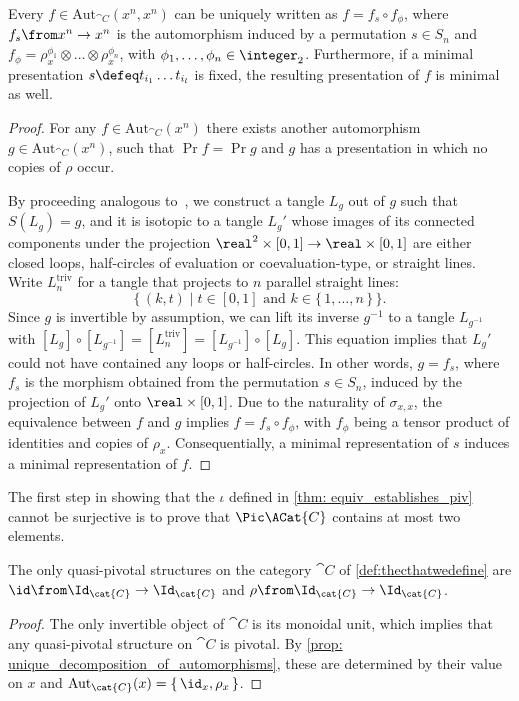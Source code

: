 \begin{proposition}\label{prop: unique_decomposition_of_automorphisms}
  Every \(f \in \mathrm{Aut}_{\cat{C}}(x^n, x^n)\) can be uniquely written as \(f = f_s \circ f_\phi\),
  where \(f_s \from x^n \to x^n\) is the automorphism induced by a permutation \(s \in S_n\) and
  \(f_\phi = \rho_x^{\phi_1} \otimes \dots \otimes \rho_x^{\phi_n}\),
  with \(\phi_1, \dots, \phi_n \in \integer_2\).
  Furthermore, if a minimal presentation \(s \defeq t_{i_1}\dots t_{i_l}\) is fixed, the resulting presentation of \(f\) is minimal as well.
\end{proposition}
\begin{proof}
  For any \(f \in \mathrm{Aut}_{\cat{C}}(x^n)\)
  there exists another automorphism \(g \in \mathrm{Aut}_{\cat{C}}(x^n)\),
  such that \(\Pr f = \Pr g\) and \(g\) has a presentation in which no copies of \(\rho\) occur.

  By proceeding analogous to~\cite[Lemma~\textsc{x}.3.3]{Kassel1998},
  we construct a tangle \(L_g\) out of \(g\) such that \(S(L_g)=g\),
  and it is isotopic to a tangle \(L_g'\) whose images of its connected components under the projection \(\real^2\times [0,1] \to \real\times [0,1]\) are either closed loops, half-circles of evaluation or coevaluation-type, or straight lines.
  Write \(L_n^{\text{triv}}\) for a tangle that projects to \(n\) parallel straight lines:
  \[
    \{\, (k,t) \mid t \in [0,1] \text{ and } k \in \{\,1, \dots, n\,\} \,\}.
  \]
  Since \(g\) is invertible by assumption,
  we can lift its inverse \(g^{-1}\) to a tangle \(L_{g^{-1}}\)
  with \([L_g] \circ [L_{g^{-1}}] = [L_n^{\text{triv}}] = [L_{g^{-1}}] \circ [L_g] \).
  This equation implies that \(L_g'\) could not have contained any loops or half-circles.
  In other words, \(g = f_s\), where \(f_s\) is the morphism obtained from the permutation \(s \in S_n\),
  induced by the projection of \(L_g'\) onto \(\real \times [0,1]\).
  Due to the naturality of \(\sigma_{x,x}\),
  the equivalence between \(f\) and \(g\) implies \(f = f_s \circ f_\phi\),
  with \(f_\phi\) being a tensor product of identities and copies of \(\rho_x\).
  Consequentially, a minimal representation of \(s\) induces a minimal representation of \(f\).
\end{proof}

The first step in showing that the \(\iota\) defined in \cref{thm: equiv_establishes_piv} cannot be surjective
is to prove that \(\Pic \ACat{C}\) contains at most two elements.

\begin{corollary}\label{cor: piv_on_C}
  The only quasi-pivotal structures on the category \(\cat{C}\) of \cref{def:thecthatwedefine} are
  \(\id \from \Id_\cat{C} \to \Id_\cat{C}\)
  and \(\rho\from \Id_\cat{C} \to \Id_\cat{C}\).
\end{corollary}
\begin{proof}
  The only invertible object of \(\cat{C}\) is its monoidal unit,
  which implies that any quasi-pivotal structure on \(\cat{C}\) is pivotal.
  By \cref{prop: unique_decomposition_of_automorphisms},
  these are determined by their value on \(x\) and
  \(\mathrm{Aut}_{\cat{C}}(x) = \{\,\id_x, \rho_x\,\}\).
\end{proof}

